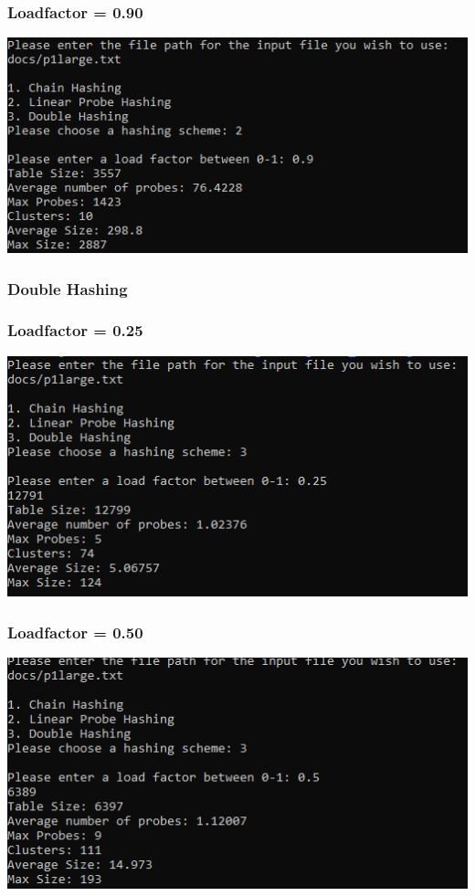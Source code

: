 \documentclass[titlepage]{article}
\begin{document}
\subsubsection{Loadfactor = 0.90}
\includegraphics[]{Large_Input/LF_0_90/LinearProbe.png}

\subsubsection{Double Hashing}
\subsubsection{Loadfactor = 0.25}
\includegraphics[]{Large_Input/LF_0_25/DoubleHash.png}
\subsubsection{Loadfactor = 0.50}
\includegraphics[]{Large_Input/LF_0_50/DoubleHash.png}
\end{document}
